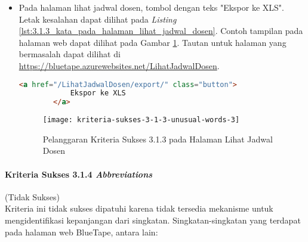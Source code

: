 \begin{itemize}
    \item Pada halaman lihat jadwal dosen, tombol dengan teks "Ekspor ke XLS". Letak kesalahan dapat dilihat pada \textit{Listing} \ref{lst:3.1.3_kata_pada_halaman_lihat_jadwal_dosen}. Contoh tampilan pada halaman web dapat dilihat pada Gambar \ref{fig:3.1.3_unusual_words_3}. Tautan untuk halaman yang bermasalah dapat dilihat di \url{https://bluetape.azurewebsites.net/LihatJadwalDosen}.
    \begin{lstlisting}[frame=single, label={lst:3.1.3_kata_pada_halaman_lihat_jadwal_dosen}, language=HTML, caption=Pelanggaran Kriteria Sukses 3.1.3 pada Halaman Lihat Jadwal Dosen]
        <a href="/LihatJadwalDosen/export/" class="button">
            Ekspor ke XLS
        </a>
    \end{lstlisting}
    
    \begin{figure}[H]
        \centering  
        \texttt{[image: kriteria-sukses-3-1-3-unusual-words-3]}  
        \caption[Pelanggaran Kriteria Sukses 3.1.3 pada Halaman Lihat Jadwal Dosen]{Pelanggaran Kriteria Sukses 3.1.3 pada Halaman Lihat Jadwal Dosen}
        \label{fig:3.1.3_unusual_words_3}  
    \end{figure}
    
\end{itemize}

\paragraph{Kriteria Sukses 3.1.4 \textit{Abbreviations}}
\label{par:kepatuhan_bluetape_kriteria_sukses_3.1.4}
(Tidak Sukses)\\

Kriteria ini tidak sukses dipatuhi karena tidak tersedia mekanisme untuk mengidentifikasi kepanjangan dari singkatan. Singkatan-singkatan yang terdapat pada halaman web BlueTape, antara lain:

